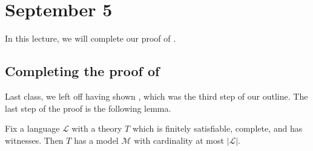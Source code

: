 \documentclass[../notes.tex]{subfiles}
\begin{document}
\section{September 5}

In this lecture, we will complete our proof of .

\subsection{Completing the proof of \texorpdfstring{}{the Compactness Theorem}}
Last class, we left off having shown , which was the third step of our outline. The last step of the proof is the following lemma.
\begin{lemma} \label{lem:last-compactness-lemma}
	Fix a language $\mathcal L$ with a theory $T$ which is finitely satisfiable, complete, and has witnesses. Then $T$ has a model $\mathcal M$ with cardinality at most $\left|\mathcal L\right|$.
\end{lemma}
\end{document}
